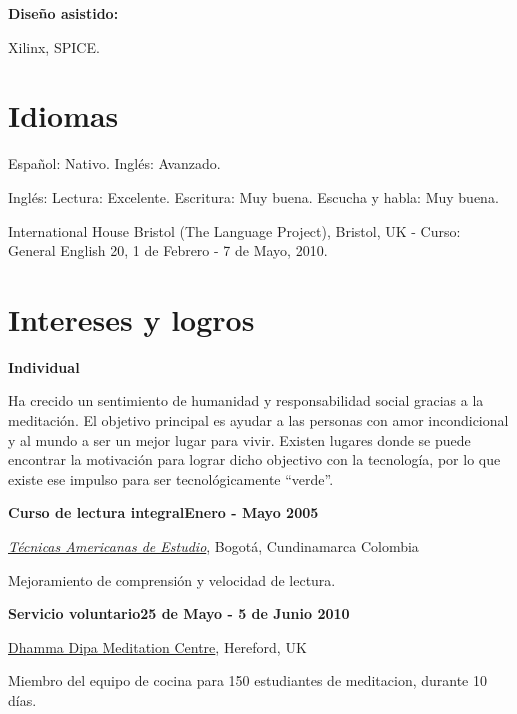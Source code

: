 \textbf{Dise\~no asistido:} 
    \begin{innerlist}
\item Xilinx, SPICE.
    \end{innerlist}


\halfblankline

\section{Idiomas}
%
Espa\~{n}ol: Nativo. Ingl\'es: Avanzado.

\halfblankline

Ingl\'es: Lectura: Excelente. Escritura: Muy buena.
Escucha y habla: Muy buena.

\halfblankline

International House Bristol (The Language Project), Bristol, UK - Curso: General English 20, 1 de Febrero - 7 de Mayo, 2010.

\section{Intereses y logros}
%
\textbf{Individual}

\begin{outerlist}
\item[] Ha crecido un sentimiento de humanidad y responsabilidad social gracias
a la meditaci\'on. El objetivo principal es ayudar a las personas con amor
incondicional y al mundo a ser un mejor lugar para vivir. Existen lugares donde se puede encontrar la motivaci\'on para lograr 
dicho objectivo con la tecnolog\'ia, por lo que existe ese impulso
para ser tecnol\'ogicamente ``verde''.
%
\end{outerlist}

\halfblankline

\textbf{Curso de lectura integral\hfill Enero - Mayo 2005}
\begin{outerlist}

\item[] \href{http://www.tecnicasamericanas.com/}{\textit{T\'ecnicas Americanas
de Estudio}}, Bogot\'a, Cundinamarca Colombia%
\begin{innerlist}
\item Mejoramiento de comprensi\'on y velocidad de lectura.
\end{innerlist}
\end{outerlist}

\halfblankline

\textbf{Servicio voluntario\hfill 25 de Mayo - 5 de Junio 2010}
\begin{outerlist}

\item[] \href{http://www.dipa.dhamma.org/}{Dhamma Dipa Meditation Centre},
Hereford, UK%
\begin{innerlist}
\item Miembro del equipo de cocina para 150 estudiantes de meditacion, durante
10 d\'ias.
\end{innerlist}
\end{outerlist}

